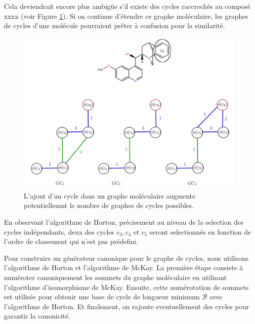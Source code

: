 Cela deviendrait encore plus ambigüe s'il existe des cycles raccrochés au composé xxxx (voir Figure \ref{differentsgraphes}). Si on continue d'étendre ce graphe moléculaire, les graphes de cycles d'une molécule pourraient prêter à confusion pour la similarité. 

\begin{figure}[H]
\label{differentsgraphes}
\begin{center}
\includegraphics[scale=0.4]{graphes_different.png}
\end{center}
\caption{L'ajout d'un cycle dans un graphe moléculaire augmente potentiellemnt le nombre de graphes de cycles possibles.}
\end{figure}

En observant l'algorithme de Horton, précisement au niveau de la selection des cycles indépendants, deux des cycles $c_3, c_4$ et $c_5$ seront selectionnés en fonction de l'ordre de classement qui n'est pas prédefini.



Pour construire un générateur canonique pour le graphe de cycles, nous utilisons l'algorithme de Horton et l'algorithme de McKay.  La première étape consiste à numéroter canoniquement les sommets du graphe moléculaire en utilisant l'algorithme d'isomorphisme de McKay. Ensuite, cette numérotation de sommets est utilisée pour obtenir une base de cycle de longueur minimum $\mathcal{B}$ avec l'algorithme de Horton. Et finalement, on rajoute eventuellement des cycles pour garantir la canonicité.


